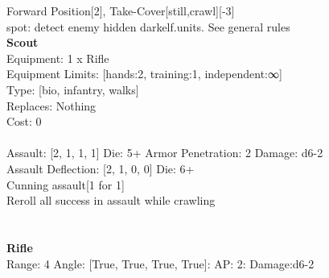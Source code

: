 \noindent Forward Position[2], Take-Cover[still,crawl][-3]\\ 
spot: detect enemy hidden darkelf.units. See general rules\\ 


{\bf Scout } \\
Equipment: 1 x Rifle \\
Equipment Limits: [hands:2, training:1, independent:∞] \\
Type: [bio, infantry, walks] \\
Replaces: Nothing \\
Cost: 0\\
\ \\
Assault: [2, 1, 1, 1] Die: 5+ Armor Penetration: 2 Damage: d6-2 \\
Assault Deflection: [2, 1, 0, 0] Die: 6+\\
\indent Cunning assault[1 for 1]\\ 
Reroll all success in assault while crawling\\ 
 
\ \\

\ \\
{\bf Rifle } \\



Range: 4  Angle: [True, True, True, True]: AP: 2: Damage:d6-2 \\




 
\ \\



